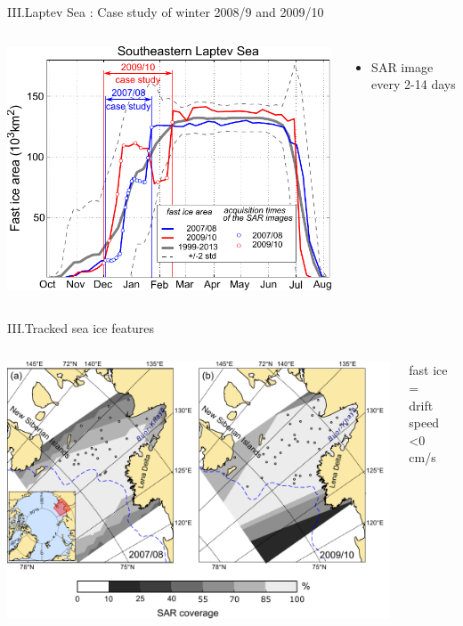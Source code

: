 \documentclass[8pt]{beamer}
\begin{document}
\setwatermark{\fontsize{125pt}{125pt}\selectfont{}}
\begin{frame}[fragile]{III.Laptev Sea : Case study of winter 2008/9 and 2009/10}
\begin{columns}
	\includegraphics[width=1\textwidth]{./img/casestudy.pdf}
	\begin{itemize}
		\item SAR image every 2-14 days
	\end{itemize}
\end{columns}
\end{frame}

\setwatermark{\fontsize{125pt}{125pt}\selectfont{}}
\begin{frame}[fragile]{III.Tracked sea ice features}
\begin{columns}
		\begin{center}
		\includegraphics[width=1\textwidth]{./img/trackpoints.pdf}
		\end{center}
	\centering
	fast ice \\= \\ drift speed \textless 0 cm/s
\end{columns}
\end{frame}
\end{document}
